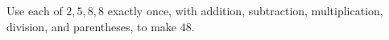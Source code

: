 Use each of $2,5,8,8$ exactly once, with addition, subtraction, multiplication, division, and parentheses, to make $48$.

